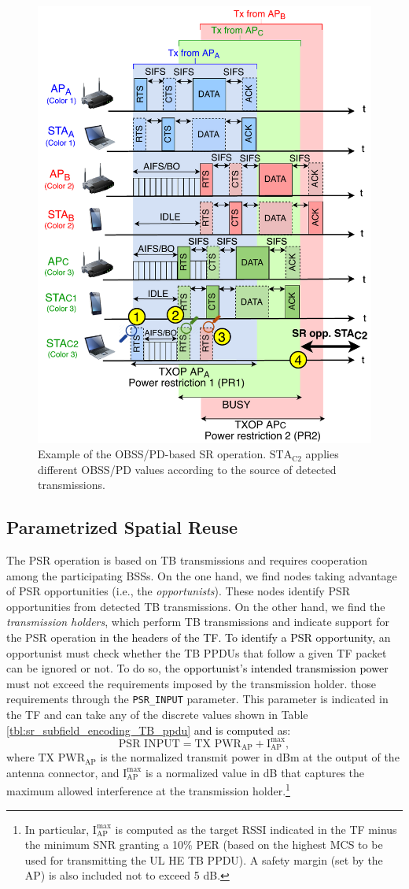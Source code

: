\documentclass[preprint,12pt]{elsarticle}
\begin{document}
\begin{figure}[ht!]
	\centering
	\includegraphics[width=.55\columnwidth]{fig_12}
	\caption{Example of the OBSS/PD-based SR operation. $\text{STA}_\text{C2}$ applies different OBSS/PD values according to the source of detected transmissions.}
	\label{fig:fig_12}
\end{figure}

\subsection{Parametrized Spatial Reuse}
\label{section:srp_based}	
The PSR operation is based on TB transmissions and requires cooperation among the participating BSSs. On the one hand, we find nodes taking advantage of PSR opportunities (i.e., the \emph{opportunists}). These nodes identify PSR opportunities from detected TB transmissions. On the other hand, we find the \emph{transmission holders}, which perform TB transmissions and indicate support for the PSR operation \textcolor{black}{in the headers of the TF. To identify a PSR opportunity,} an opportunist must check whether the TB PPDUs that follow a given TF packet can be ignored or not. To do so, the \textcolor{black}{opportunist's intended transmission power} must not exceed the requirements imposed by the transmission holder.  those requirements through the \texttt{PSR\_INPUT} parameter. This parameter is indicated in the TF and can take any of the discrete values shown in Table \ref{tbl:sr_subfield_encoding_TB_ppdu} \textcolor{black}{and is computed as:}
\begin{equation}
\text{PSR INPUT} = \text{TX PWR}_\text{AP} + \text{I}_\text{AP}^{\max},
\label{eq:srp_input}
\nonumber
\end{equation}
where $\text{TX PWR}_\text{AP}$ is the normalized transmit power in dBm at the output of the antenna connector, and $\text{I}_\text{AP}^{\max}$ is a normalized value in dB that captures the maximum allowed interference at the transmission holder.\footnote{In particular, $\text{I}_\text{AP}^{\max}$ is computed as the target RSSI indicated in the TF minus the minimum SNR granting a 10\% PER (based on the highest MCS to be used for transmitting the UL HE TB PPDU). A safety margin (set by the AP) is also included not to exceed 5 dB.}
\end{document}
